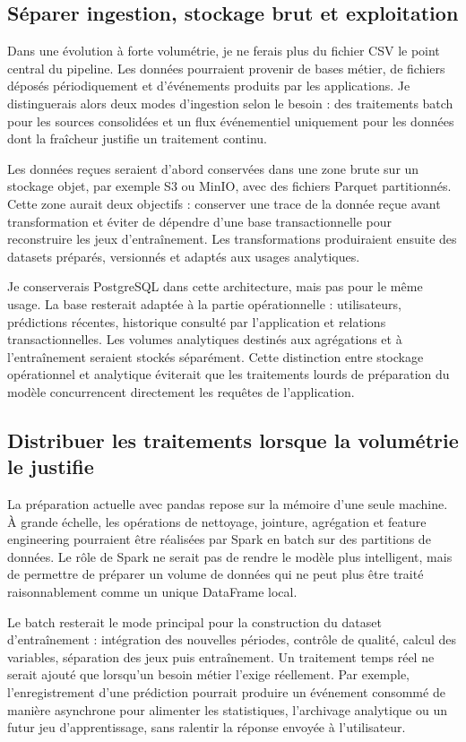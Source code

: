 \subsection{Séparer ingestion, stockage brut et exploitation}

Dans une évolution à forte volumétrie, je ne ferais plus du fichier CSV le point central du pipeline. Les données pourraient provenir de bases métier, de fichiers déposés périodiquement et d'événements produits par les applications. Je distinguerais alors deux modes d'ingestion selon le besoin : des traitements batch pour les sources consolidées et un flux événementiel uniquement pour les données dont la fraîcheur justifie un traitement continu.

Les données reçues seraient d'abord conservées dans une zone brute sur un stockage objet, par exemple S3 ou MinIO, avec des fichiers Parquet partitionnés. Cette zone aurait deux objectifs : conserver une trace de la donnée reçue avant transformation et éviter de dépendre d'une base transactionnelle pour reconstruire les jeux d'entraînement. Les transformations produiraient ensuite des datasets préparés, versionnés et adaptés aux usages analytiques.

Je conserverais PostgreSQL dans cette architecture, mais pas pour le même usage. La base resterait adaptée à la partie opérationnelle : utilisateurs, prédictions récentes, historique consulté par l'application et relations transactionnelles. Les volumes analytiques destinés aux agrégations et à l'entraînement seraient stockés séparément. Cette distinction entre stockage opérationnel et analytique éviterait que les traitements lourds de préparation du modèle concurrencent directement les requêtes de l'application.

\subsection{Distribuer les traitements lorsque la volumétrie le justifie}

La préparation actuelle avec pandas repose sur la mémoire d'une seule machine. À grande échelle, les opérations de nettoyage, jointure, agrégation et feature engineering pourraient être réalisées par Spark en batch sur des partitions de données. Le rôle de Spark ne serait pas de rendre le modèle plus intelligent, mais de permettre de préparer un volume de données qui ne peut plus être traité raisonnablement comme un unique DataFrame local.

Le batch resterait le mode principal pour la construction du dataset d'entraînement : intégration des nouvelles périodes, contrôle de qualité, calcul des variables, séparation des jeux puis entraînement. Un traitement temps réel ne serait ajouté que lorsqu'un besoin métier l'exige réellement. Par exemple, l'enregistrement d'une prédiction pourrait produire un événement consommé de manière asynchrone pour alimenter les statistiques, l'archivage analytique ou un futur jeu d'apprentissage, sans ralentir la réponse envoyée à l'utilisateur.

